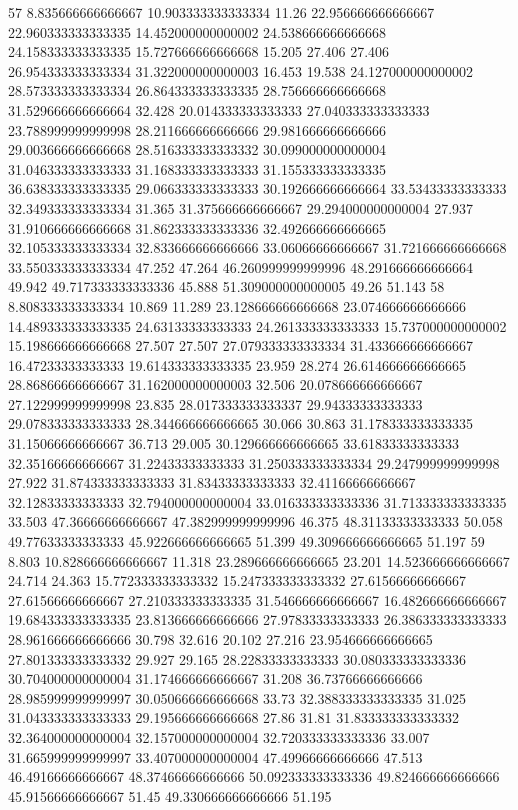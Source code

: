 57 8.835666666666667 10.903333333333334 11.26 22.956666666666667 22.960333333333335 14.452000000000002 24.538666666666668 24.158333333333335 15.727666666666668 15.205 27.406 27.406 26.954333333333334 31.322000000000003 16.453 19.538 24.127000000000002 28.573333333333334 26.864333333333335 28.756666666666668 31.529666666666664 32.428 20.014333333333333 27.040333333333333 23.788999999999998 28.211666666666666 29.981666666666666 29.003666666666668 28.516333333333332 30.099000000000004 31.046333333333333 31.168333333333333 31.155333333333335 36.638333333333335 29.066333333333333 30.192666666666664 33.53433333333333 32.349333333333334 31.365 31.375666666666667 29.294000000000004 27.937 31.910666666666668 31.862333333333336 32.492666666666665 32.105333333333334 32.833666666666666 33.06066666666667 31.721666666666668 33.550333333333334 47.252 47.264 46.260999999999996 48.291666666666664 49.942 49.717333333333336 45.888 51.309000000000005 49.26 51.143
58 8.808333333333334 10.869 11.289 23.128666666666668 23.074666666666666 14.489333333333335 24.63133333333333 24.261333333333333 15.737000000000002 15.198666666666668 27.507 27.507 27.079333333333334 31.433666666666667 16.47233333333333 19.614333333333335 23.959 28.274 26.614666666666665 28.86866666666667 31.162000000000003 32.506 20.078666666666667 27.122999999999998 23.835 28.017333333333337 29.94333333333333 29.078333333333333 28.344666666666665 30.066 30.863 31.178333333333335 31.15066666666667 36.713 29.005 30.129666666666665 33.61833333333333 32.35166666666667 31.22433333333333 31.250333333333334 29.247999999999998 27.922 31.874333333333333 31.83433333333333 32.41166666666667 32.12833333333333 32.794000000000004 33.016333333333336 31.713333333333335 33.503 47.36666666666667 47.382999999999996 46.375 48.31133333333333 50.058 49.77633333333333 45.922666666666665 51.399 49.309666666666665 51.197
59 8.803 10.828666666666667 11.318 23.289666666666665 23.201 14.523666666666667 24.714 24.363 15.772333333333332 15.247333333333332 27.61566666666667 27.61566666666667 27.210333333333335 31.546666666666667 16.482666666666667 19.684333333333335 23.813666666666666 27.97833333333333 26.386333333333333 28.961666666666666 30.798 32.616 20.102 27.216 23.954666666666665 27.801333333333332 29.927 29.165 28.22833333333333 30.080333333333336 30.704000000000004 31.174666666666667 31.208 36.73766666666666 28.985999999999997 30.050666666666668 33.73 32.388333333333335 31.025 31.043333333333333 29.195666666666668 27.86 31.81 31.833333333333332 32.364000000000004 32.157000000000004 32.720333333333336 33.007 31.665999999999997 33.407000000000004 47.49966666666666 47.513 46.49166666666667 48.37466666666666 50.092333333333336 49.824666666666666 45.91566666666667 51.45 49.330666666666666 51.195
